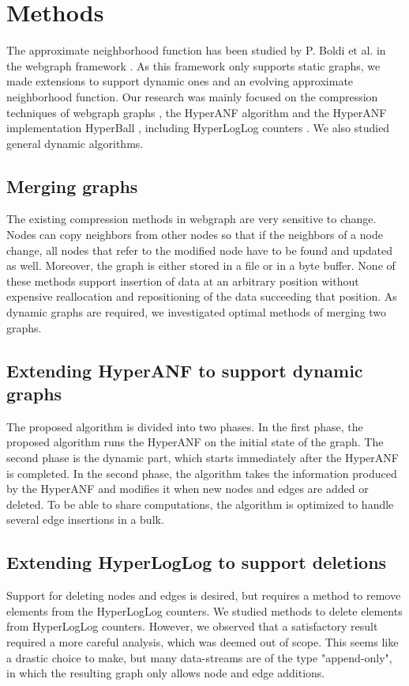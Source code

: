 \chapter{Methods}

The approximate neighborhood function has been studied by P. Boldi et al. in the webgraph framework \cite{webgraph}. As this framework only supports static graphs, we made extensions to support dynamic ones and an evolving approximate neighborhood function. Our research was mainly focused on the compression techniques of webgraph graphs \cite{webgraph-compression}, the HyperANF algorithm \cite{hyperanf} and the HyperANF implementation HyperBall \cite{hyperball}, including HyperLogLog counters \cite{hyperloglog}. We also studied general dynamic algorithms.

\section{Merging graphs}
The existing compression methods in webgraph are very sensitive to change. Nodes can copy neighbors from other nodes so that if the neighbors of a node change, all nodes that refer to the modified node have to be found and updated as well. Moreover, the graph is either stored in a file or in a byte buffer. None of these methods support insertion of data at an arbitrary position without expensive reallocation and repositioning of the data succeeding that position. As dynamic graphs are required, we investigated optimal methods of merging two graphs.

\section{Extending HyperANF to support dynamic graphs}
The proposed algorithm is divided into two phases. In the first phase, the proposed algorithm runs the HyperANF on the initial state of the graph. The second phase is the dynamic part, which starts immediately after the HyperANF is completed. In the second phase, the algorithm takes the information produced by the HyperANF and modifies it when new nodes and edges are added or deleted. To be able to share computations, the algorithm is optimized to handle several edge insertions in a bulk.

\section{Extending HyperLogLog to support deletions}
Support for deleting nodes and edges is desired, but requires a method to remove elements from the HyperLogLog counters. We studied methods to delete elements from HyperLogLog counters. However, we observed that a satisfactory result required a more careful analysis, which was deemed out of scope. This seems like a drastic choice to make, but many data-streams are of the type "append-only", in which the resulting graph only allows node and edge additions.

